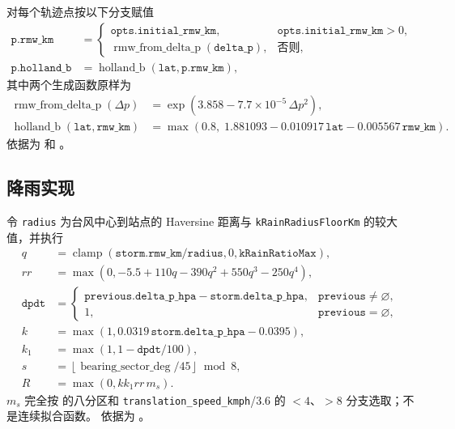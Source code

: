  对每个轨迹点按以下分支赋值
\begin{align}
 \texttt{p.rmw\_km}&=\begin{cases}
 \texttt{opts.initial\_rmw\_km},&\texttt{opts.initial\_rmw\_km}>0,\\
 \operatorname{rmw\_from\_delta\_p}(\texttt{delta\_p}),&\text{否则},
 \end{cases}\\
 \texttt{p.holland\_b}&=\operatorname{holland\_b}(\texttt{lat},\texttt{p.rmw\_km}),
\end{align}
其中两个生成函数原样为
\begin{align}
 \operatorname{rmw\_from\_delta\_p}(\Delta p)
 &=\exp\!\left(3.858-7.7\times10^{-5}\,\Delta p^{2}\right),\\
 \operatorname{holland\_b}(\texttt{lat},\texttt{rmw\_km})
 &=\max\!\left(0.8,\;1.881093-0.010917\,\texttt{lat}
   -0.005567\,\texttt{rmw\_km}\right).
\end{align}
依据为  和
。

\subsection{降雨实现}

令 \texttt{radius} 为台风中心到站点的 Haversine 距离与
\texttt{kRainRadiusFloorKm} 的较大值，并执行
\begin{align}
 q&=\operatorname{clamp}(\texttt{storm.rmw\_km}/\texttt{radius},0,
       \texttt{kRainRatioMax}),\\
 rr&=\max(0,-5.5+110q-390q^2+550q^3-250q^4),\\
 \texttt{dpdt}&=\begin{cases}
 \texttt{previous.delta\_p\_hpa}-\texttt{storm.delta\_p\_hpa},&\texttt{previous}\ne\varnothing,\\
 1,&\texttt{previous}=\varnothing,
 \end{cases}\\
 k&=\max(1,0.0319\,\texttt{storm.delta\_p\_hpa}-0.0395),\\
 k_1&=\max(1,1-\texttt{dpdt}/100),\\
 s&=\left\lfloor\operatorname{bearing\_sector\_deg}/45\right\rfloor\bmod 8,\\
 R&=\max(0,k k_1 rr\,m_s).
\end{align}
$m_s$ 完全按  的八分区和
\texttt{translation\_speed\_kmph}/3.6 的 $<4$、$>8$ 分支选取；不是连续拟合函数。
依据为 。

